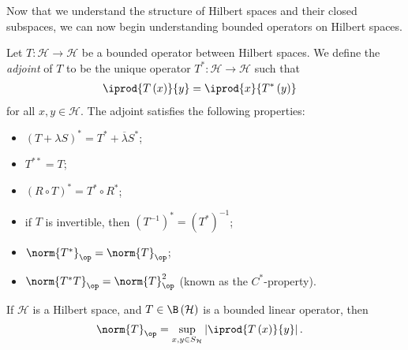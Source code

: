 Now that we understand the structure of Hilbert spaces and their closed subspaces, we can now begin understanding bounded operators on Hilbert spaces.
\begin{definition}\label{def:adjoint_properties}
  Let $T\colon \mathcal{H}\rightarrow \mathcal{H}$ be a bounded operator between Hilbert spaces. We define the \textit{adjoint} of $T$ to be the unique operator $T^{\ast}\colon \mathcal{H}\rightarrow \mathcal{H}$ such that
  \begin{align*}
    \iprod{T\left(x\right)}{y} &= \iprod{x}{T^{\ast}\left(y\right)}
  \end{align*}
  for all $x,y\in \mathcal{H}$. The adjoint satisfies the following properties:
  \begin{itemize}
    \item $\left(T + \lambda S\right)^{\ast} = T^{\ast} + \overline{\lambda}S^{\ast}$;
    \item $T^{\ast\ast} = T$;
    \item $\left(R\circ T\right)^{\ast} = T^{\ast}\circ R^{\ast}$;
    \item if $T$ is invertible, then $\left(T^{-1}\right)^{\ast} = \left(T^{\ast}\right)^{-1}$;
    \item $\norm{T^{\ast}}_{\op} = \norm{T}_{\op}$;
    \item $\norm{T^{\ast}T}_{\op} = \norm{T}_{\op}^2$ (known as the $C^{\ast}$-property).
  \end{itemize}
\end{definition}
\begin{lemma}\label{lemma:operator_norm_hilbert_space}
  If $\mathcal{H}$ is a Hilbert space, and $T\in \B\left( \mathcal{H} \right)$ is a bounded linear operator, then
  \begin{align*}
    \norm{T}_{\op} &= \sup_{x,y\in S_{\mathcal{H}}} \left\vert \iprod{T\left( x \right)}{y} \right\vert.
  \end{align*}
  
\end{lemma}

